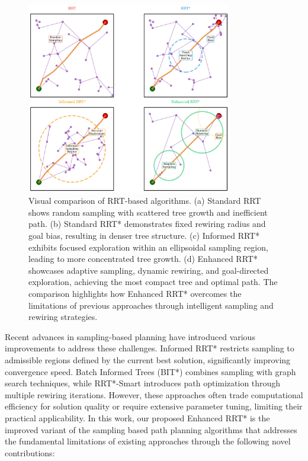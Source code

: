 \documentclass[pdflatex,sn-mathphys-num]{sn-jnl}
\theoremstyle{thmstyleone}%
\theoremstyle{thmstyletwo}%
\theoremstyle{thmstylethree}%
\begin{document}
\begin{figure}[htbp] 
\centering 
\includegraphics[width=0.8\textwidth]{fig1.png} 
\caption{Visual comparison of RRT-based algorithms. (a) Standard RRT shows random sampling with scattered tree growth and inefficient path. (b) Standard RRT* demonstrates fixed rewiring radius and goal bias, resulting in denser tree structure. (c) Informed RRT* exhibits focused exploration within an ellipsoidal sampling region, leading to more concentrated tree growth. (d) Enhanced RRT* showcases adaptive sampling, dynamic rewiring, and goal-directed exploration, achieving the most compact tree and optimal path. The comparison highlights how Enhanced RRT* overcomes the limitations of previous approaches through intelligent sampling and rewiring strategies.} 
\label{fig:algorithm_comparison} 
\end{figure} 

Recent advances in sampling-based planning have introduced various improvements to address these challenges. Informed RRT* \cite{14} restricts sampling to admissible regions defined by the current best solution, significantly improving convergence speed. Batch Informed Trees (BIT*) \cite{15} combines sampling with graph search techniques, while RRT*-Smart \cite{16} introduces path optimization through multiple rewiring iterations. However, these approaches often trade computational efficiency for solution quality or require extensive parameter tuning, limiting their practical applicability. In this work, our proposed Enhanced RRT* is the improved variant of the sampling based path planning algorithms that addresses the fundamental limitations of existing approaches through the following novel contributions:
\end{document}
